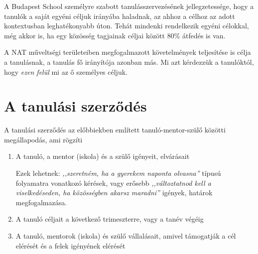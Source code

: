 \begin{comment}
\end{table}

A személyre szabott tanulás két dologban is eltér a hagyományos modelltől: a hagyományos iskolamodellben mindenki ugyanazért a kimenetért dolgozik, és mindenki mindent ugyanakkor és ugyanúgy tanul, csinál. Ez az, amikor mindent egy kaptafára húzunk, a nemzetközi szakirodalomban \emph{one size fits all education} címkézik ezt a megközelítést.

A hagyományos iskolák következő szinjén kialakult a „minden gyerek más" elv mentén az egyéni utak, a differenciálás fogalma. Bár mindenkinek hasonló a célja, a tanárok differenciáltan próbálják átadni a tudást, odafigyelve az egyéni igényekre.
\end{comment}

A Budapest School személyre szabott tanulásszervezésének jellegzetessége, hogy a tanulók a saját egyéni céljuk irányába haladnak, az ahhoz a célhoz az adott kontextusban leghatékonyabb úton. Tehát mindenki rendelkezik egyéni célokkal, még akkor is, ha egy közösség tagjainak céljai között 80\% átfedés is van.

A NAT műveltségi területeiben megfogalmazott követelmények teljesítése is célja a tanulásnak, a tanulás fő irányítója azonban más. Mi azt kérdezzük a tanulóktól, hogy \emph{ezen felül} mi az ő személyes céljuk.

\section{A tanulási szerződés}


A tanulási szerződés az előbbiekben említett tanuló-mentor-szülő közötti megállapodás, ami rögzíti
\begin{enumerate}
\item A tanuló, a mentor (iskola) és a szülő igényeit, elvárásait

    Ezek lehetnek: \emph{,,szeretném, ha a gyerekem naponta olvasna''} típusú folyamatra vonatkozó kérések, vagy erősebb \emph{,,változtatnod kell a viselkedéseden, ha közösségben akarsz maradni''} igények, határok megfogalmazása.

\item A tanuló céljait a következő trimeszterre, vagy a tanév végéig

\item A tanuló, mentorok (iskola) és szülő vállalásait, amivel támogatják a cél elérését és a felek igényének elérését

\end{enumerate}

